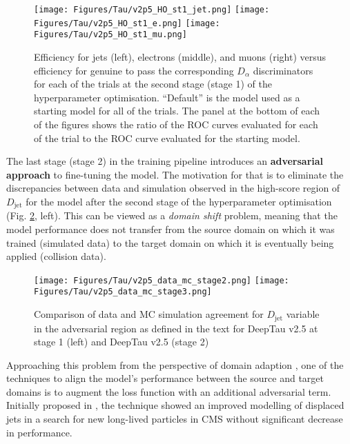 \begin{figure}[ht!]
    \centering
    \texttt{[image: Figures/Tau/v2p5\_HO\_st1\_jet.png]}
    \texttt{[image: Figures/Tau/v2p5\_HO\_st1\_e.png]}
    \texttt{[image: Figures/Tau/v2p5\_HO\_st1\_mu.png]}
    \caption{Efficiency for jets (left), electrons (middle), and muons (right) versus efficiency for genuine \tauh to pass the corresponding $D_\alpha$ discriminators for each of the trials at the second stage (stage 1) of the hyperparameter optimisation. \enquote{Default} is the model used as a starting model for all of the trials. The panel at the bottom of each of the figures shows the ratio of the ROC curves evaluated for each of the trial to the ROC curve evaluated for the starting model.}
    \label{fig:v2p5_HO_stage1_performance}
\end{figure}

The last stage (stage 2) in the training pipeline introduces an \textbf{adversarial approach} to fine-tuning the model. The motivation for that is to eliminate the discrepancies between data and simulation observed in the high-score region of $D_{\text{jet}}$ for the model after the second stage of the hyperparameter optimisation (Fig. \ref{fig:v2p5_data_mc}, left). This can be viewed as a \textit{domain shift} problem, meaning that the model performance does not transfer from the source domain on which it was trained (simulated data) to the target domain on which it is eventually being applied (collision data).

\begin{figure}[ht!]
    \centering
    \texttt{[image: Figures/Tau/v2p5\_data\_mc\_stage2.png]}
    \texttt{[image: Figures/Tau/v2p5\_data\_mc\_stage3.png]}
    \caption{Comparison of data and MC simulation agreement for $D_{\text{jet}}$ variable in the adversarial region as defined in the text for DeepTau v2.5 at stage 1 (left) and DeepTau v2.5 (stage 2)}
    \label{fig:v2p5_data_mc}
\end{figure}

Approaching this problem from the perspective of domain adaption \cite{wang2018deep}, one of the techniques to align the model's performance between the source and target domains is to augment the loss function with an additional adversarial term. Initially proposed in \cite{ganin2015unsupervised, Louppe:2016ylz}, the technique showed an improved modelling of displaced jets in a search for new long-lived particles in CMS \cite{CMS:2019dqq} without significant decrease in performance.  

